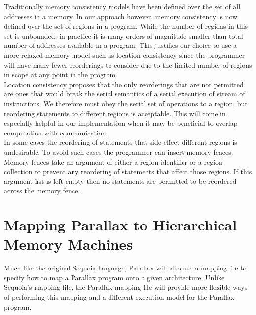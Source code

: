 \documentclass{article}
\theoremstyle{definition}
\begin{document}
\noindent
Traditionally memory consistency models have been defined over the set of
all addresses in a memory.  In our approach however, memory consistency
is now defined over the set of regions in a program.  While the number of
regions in this set is unbounded, in practice it is many orders of magnitude
smaller than total number of addresses available in a program.  This justifies
our choice to use a more relaxed memory model such as location consistency 
since the programmer will have many fewer reorderings to consider due to 
the limited number of regions in scope at any point in the program. \\ 

\noindent
Location consistency proposes that the only reorderings that are not permitted
are ones that would break the serial semantics of a serial execution of stream
of instructions.  We therefore must obey the serial set of operations to a region,
but reordering statements to different regions is acceptable.  This will come
in especially helpful in our implementation when it may be beneficial to overlap
computation with communication. \\

\noindent
In some cases the reordering of statements that side-effect different
regions is undesirable.  To avoid such cases the programmer can insert memory
fences.  Memory fences take an argument of either a region identifier or a region
collection to prevent any reordering of statements that affect those regions.  If
this argument list is left empty then no statements are permitted to be reordered
across the memory fence.   

\pagebreak


\section{Mapping Parallax to Hierarchical Memory Machines \label{Mapping}}
\noindent
Much like the original Sequoia language, Parallax will also use a mapping
file to specify how to map a Parallax program onto a given architecture.  Unlike
Sequoia's mapping file, the Parallax mapping file will provide more flexible
ways of performing this mapping and a different execution model for the
Parallax program.
\end{document}
